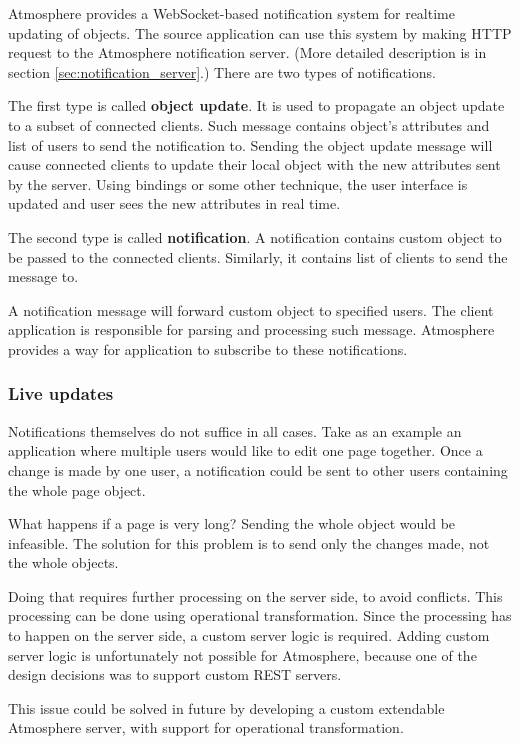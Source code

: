 Atmosphere provides a WebSocket-based notification system for realtime updating of objects. The source application can use this system by making HTTP request to the Atmosphere notification server. (More detailed description is in section \ref{sec:notification_server}.) There are two types of notifications.

The first type is called \textbf{object update}. It is used to propagate an object update to a subset of connected clients. Such message contains object's attributes and list of users to send the notification to. Sending the object update message will cause connected clients to update their local object with the new attributes sent by the server. Using bindings or some other technique, the user interface is updated and user sees the new attributes in real time.

The second type is called \textbf{notification}. A notification contains custom object to be passed to the connected clients. Similarly, it contains list of clients to send the message to. 

A notification message will forward custom object to specified users. The client application is responsible for parsing and processing such message. Atmosphere provides a way for application to subscribe to these notifications.

\subsubsection{Live updates}

Notifications themselves do not suffice in all cases. Take as an example an application where multiple users would like to edit one page together. Once a change is made by one user, a notification could be sent to other users containing the whole page object.

What happens if a page is very long? Sending the whole object would be infeasible. The solution for this problem is to send only the changes made, not the whole objects.

Doing that requires further processing on the server side, to avoid conflicts. This processing can be done using operational transformation. \citep{ot} Since the processing has to happen on the server side, a custom server logic is required. Adding custom server logic is unfortunately not possible for Atmosphere, because one of the design decisions was to support custom REST servers.

This issue could be solved in future by developing a custom extendable Atmosphere server, with support for operational transformation.

